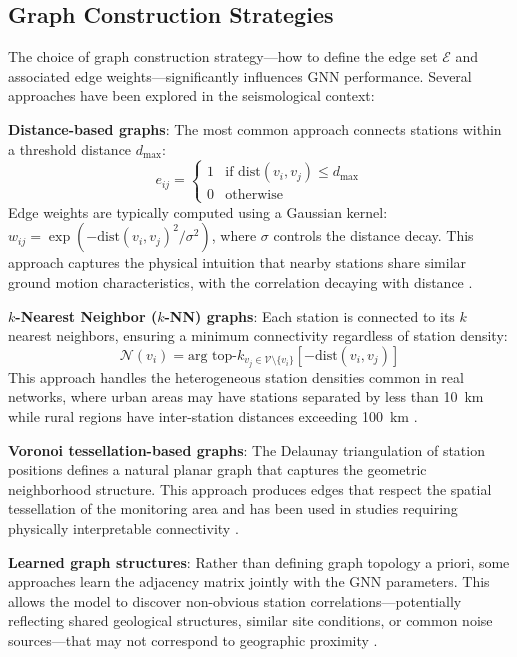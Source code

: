 \documentclass[review,authoryear]{elsarticle}
\begin{document}
\subsection{Graph Construction Strategies}

The choice of graph construction strategy---how to define the edge set $\mathcal{E}$ and associated edge weights---significantly influences GNN performance. Several approaches have been explored in the seismological context:

\textbf{Distance-based graphs}: The most common approach connects stations within a threshold distance $d_{\text{max}}$:
\begin{equation}
e_{ij} = \begin{cases} 1 & \text{if } \text{dist}(v_i, v_j) \leq d_{\text{max}} \\ 0 & \text{otherwise} \end{cases}
\end{equation}
Edge weights are typically computed using a Gaussian kernel: $w_{ij} = \exp(-\text{dist}(v_i, v_j)^2 / \sigma^2)$, where $\sigma$ controls the distance decay. This approach captures the physical intuition that nearby stations share similar ground motion characteristics, with the correlation decaying with distance \citep{vandenende2020automated, mcbrearty2023earthquake}.

\textbf{$k$-Nearest Neighbor ($k$-NN) graphs}: Each station is connected to its $k$ nearest neighbors, ensuring a minimum connectivity regardless of station density:
\begin{equation}
\mathcal{N}(v_i) = \text{arg top-}k_{v_j \in \mathcal{V} \setminus \{v_i\}} \left[ -\text{dist}(v_i, v_j) \right]
\end{equation}
This approach handles the heterogeneous station densities common in real networks, where urban areas may have stations separated by less than 10~km while rural regions have inter-station distances exceeding 100~km \citep{zhang2021spatiotemporal}.

\textbf{Voronoi tessellation-based graphs}: The Delaunay triangulation of station positions defines a natural planar graph that captures the geometric neighborhood structure. This approach produces edges that respect the spatial tessellation of the monitoring area and has been used in studies requiring physically interpretable connectivity \citep{yano2021graph}.

\textbf{Learned graph structures}: Rather than defining graph topology a priori, some approaches learn the adjacency matrix jointly with the GNN parameters. This allows the model to discover non-obvious station correlations---potentially reflecting shared geological structures, similar site conditions, or common noise sources---that may not correspond to geographic proximity \citep{bai2020adaptive, wu2020connecting}.
\end{document}
